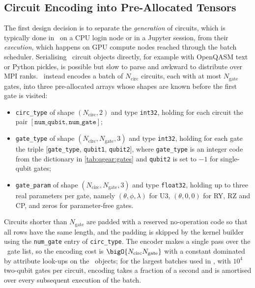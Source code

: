 \subsection{Circuit Encoding into Pre-Allocated Tensors}\label{sec:qgear:encoding}

The first design decision is to separate the \emph{generation} of circuits, which is typically done in \qiskit\ on a CPU login node or in a Jupyter session, from their \emph{execution}, which happens on GPU compute nodes reached through the batch scheduler. Serialising \qiskit\ circuit objects directly, for example with OpenQASM text or Python pickles, is possible but slow to parse and awkward to distribute over MPI ranks. \qgear\ instead encodes a batch of $N_{\mathrm{circ}}$ circuits, each with at most $N_{\mathrm{gate}}$ gates, into three pre-allocated arrays whose shapes are known before the first gate is visited:
\begin{itemize}
  \item \texttt{circ\_type} of shape $(N_{\mathrm{circ}},2)$ and type \texttt{int32}, holding for each circuit the pair $[\texttt{num\_qubit},\texttt{num\_gate}]$;
  \item \texttt{gate\_type} of shape $(N_{\mathrm{circ}},N_{\mathrm{gate}},3)$ and type \texttt{int32}, holding for each gate the triple [\texttt{gate\_type}, \texttt{qubit1}, \texttt{qubit2}], where \texttt{gate\_type} is an integer code from the dictionary in \cref{tab:qgear:gates} and \texttt{qubit2} is set to $-1$ for single-qubit gates;
  \item \texttt{gate\_param} of shape $(N_{\mathrm{circ}},N_{\mathrm{gate}},3)$ and type \texttt{float32}, holding up to three real parameters per gate, namely $(\theta,\phi,\lambda)$ for U3, $(\theta,0,0)$ for RY, RZ and CP, and zeros for parameter-free gates.
\end{itemize}
Circuits shorter than $N_{\mathrm{gate}}$ are padded with a reserved no-operation code so that all rows have the same length, and the padding is skipped by the kernel builder using the \texttt{num\_gate} entry of \texttt{circ\_type}. The encoder makes a single pass over the \qiskit\ gate list, so the encoding cost is $\bigO{N_{\mathrm{circ}}N_{\mathrm{gate}}}$ with a constant dominated by attribute look-ups on the \qiskit\ objects; for the largest batches used in \cite{guo2025qgear}, with $10^{4}$ two-qubit gates per circuit, encoding takes a fraction of a second and is amortised over every subsequent execution of the batch.

